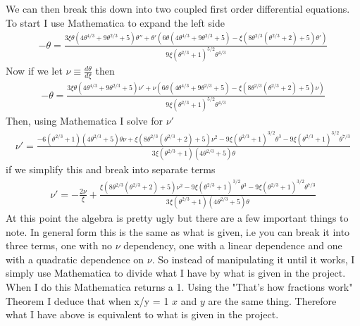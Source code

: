 We can then break this down into two coupled first order differential equations. To start I use Mathematica to expand the left side
{\small
\begin{align*}
    -\theta = \frac{3 \xi  \theta \left(4 \theta^{4/3}+9 \theta^{2/3}+5\right) \theta''+\theta
   '\left(6 \theta\left(4 \theta^{4/3}+9 \theta^{2/3}+5\right)-\xi  \left(8
   \theta^{2/3} \left(\theta^{2/3}+2\right)+5\right) \theta'\right)}{9 \xi\left(\theta^{2/3}+1\right)^{5/2} \theta^{4/3}}
\end{align*}}
Now if we let $\nu\equiv \frac{d\theta}{d\xi}$ then
{\small
\begin{align*}
    -\theta = \frac{3 \xi \theta \left(4 \theta^{4/3}+9 \theta^{2/3}+5\right) \nu'+\nu\left(6 \theta\left(4 \theta^{4/3}+9 \theta^{2/3}+5\right)-\xi \left(8
   \theta^{2/3} \left(\theta^{2/3}+2\right)+5\right) \nu\right)}{9 \xi\left(\theta^{2/3}+1\right)^{5/2} \theta^{4/3}}
\end{align*}}
Then, using Mathematica I solve for $\nu'$
{\small
\begin{align*}
    \nu' = \frac{-6 \left(\theta^{2/3}+1\right) \left(4 \theta^{2/3}+5\right) \theta \nu+\xi\left(8 \theta^{2/3} \left(\theta^{2/3}+2\right)+5\right) \nu^2-9 \xi  \left(\theta^{2/3}+1\right)^{3/2} \theta^3-9 \xi  \left(\theta^{2/3}+1\right)^{3/2} \theta^{7/3}}{3 \xi  \left(\theta^{2/3}+1\right) \left(4 \theta^{2/3}+5\right) \theta}
\end{align*}}
if we simplify this and break into separate terms
\begin{align*}
    \nu' = -\frac{2\nu}{\xi} + \frac{\xi\left(8 \theta^{2/3} \left(\theta^{2/3}+2\right)+5\right) \nu^2-9 \xi  \left(\theta^{2/3}+1\right)^{3/2} \theta^3-9 \xi  \left(\theta^{2/3}+1\right)^{3/2} \theta^{7/3}}{3 \xi  \left(\theta^{2/3}+1\right) \left(4 \theta^{2/3}+5\right) \theta}
\end{align*}
At this point the algebra is pretty ugly but there are a few important things to note. In general form this is the same as what is given, i.e you can break it into three terms, one with no $\nu$ dependency, one with a linear dependence and one with a quadratic dependence on $\nu$. So instead of manipulating it until it works, I simply use Mathematica to divide what I have by what is given in the project. When I do this Mathematica returns a 1. Using the "That's how fractions work" Theorem I deduce that when x/y = 1 $x$ and $y$ are the same thing. Therefore what I have above is equivalent to what is given in the project.

